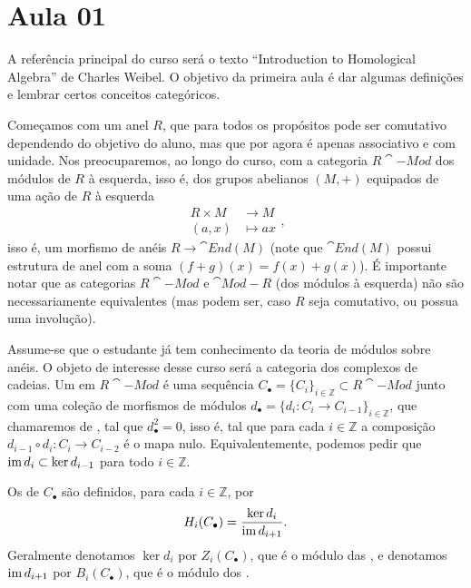 \section{Aula 01}

A referência principal do curso será o texto ``Introduction to Homological Algebra'' de Charles Weibel. O objetivo da primeira aula é dar algumas definições e lembrar certos conceitos categóricos.

Começamos com um anel $R$, que para todos os propósitos pode ser comutativo dependendo do objetivo do aluno, mas que por agora é apenas associativo e com unidade. Nos preocuparemos, ao longo do curso, com a categoria $R\cat{-Mod}$ dos módulos de $R$ à esquerda, isso é, dos grupos abelianos $(M, +)$ equipados de uma ação de $R$ à esquerda \begin{equation}
    \begin{split}
        R \times M &\to M \\ (a, x) &\mapsto ax
    \end{split},
\end{equation} isso é, um morfismo de anéis $R \to \cat{End}(M)$ (note que $\cat{End}(M)$ possui estrutura de anel com a soma $(f + g)(x) = f(x) + g(x)$). É importante notar que as categorias $R\cat{-Mod}$ e $\cat{Mod-}R$ (dos módulos à esquerda) não são necessariamente equivalentes (mas podem ser, caso $R$ seja comutativo, ou possua uma involução).

Assume-se que o estudante já tem conhecimento da teoria de módulos sobre anéis. O objeto de interesse desse curso será a categoria dos complexos de cadeias. Um  em $R\cat{-Mod}$ é uma sequência $C_\bullet = \{C_i\}_{i \in \mathbb{Z}} \subset R\cat{-Mod}$ junto com uma coleção de morfismos de módulos $d_\bullet = \{d_i \colon C_i \to C_{i-1}\}_{i \in \mathbb{Z}}$, que chamaremos de , tal que $d_\bullet^2 = 0$, isso é, tal que para cada $i \in \mathbb{Z}$ a composição $d_{i - 1} \circ d_i \colon C_i \to C_{i - 2}$ é o mapa nulo. Equivalentemente, podemos pedir que $\operatorname{im} d_i \subset \ker d_{i - 1}$ para todo $i \in \mathbb{Z}$.

Os  de $C_\bullet$ são definidos, para cada $i \in \mathbb{Z}$, por \begin{equation}
    H_i(C_\bullet) = \frac{\ker d_i}{\operatorname{im} d_{i+1}}.
\end{equation} Geralmente denotamos $\ker d_i$ por $Z_i(C_\bullet)$, que é o módulo das , e denotamos $\operatorname{im} d_{i+1}$ por $B_i(C_\bullet)$, que é o módulo dos .

